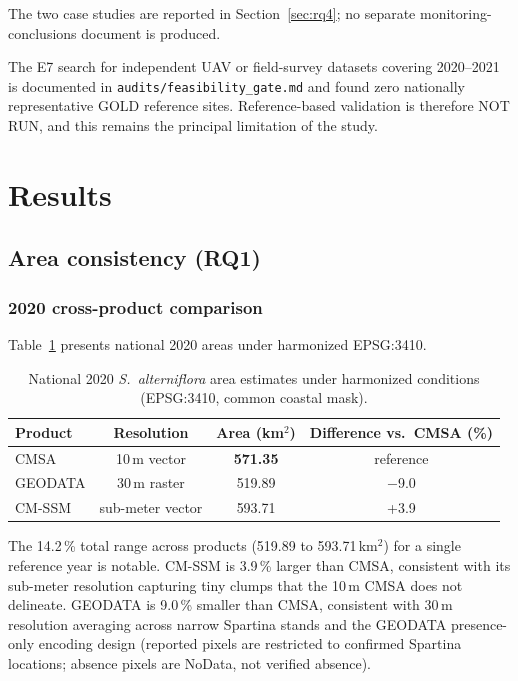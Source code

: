 \documentclass[11pt]{article}
\begin{document}
The two case studies are reported in Section~\ref{sec:rq4}; no separate
monitoring-conclusions document is produced.

The E7 search for independent UAV or field-survey datasets covering 2020--2021
is documented in \texttt{audits/feasibility\_gate.md} and found zero
nationally representative GOLD reference sites. Reference-based validation is
therefore NOT RUN, and this remains the principal limitation of the study.

\section{Results}
\label{sec:results}

\subsection{Area consistency (RQ1)}

\subsubsection{2020 cross-product comparison}

Table~\ref{tab:area2020} presents national 2020 areas under harmonized EPSG:3410.

\begin{table}[htpb]
\centering
\caption{\label{tab:area2020}National 2020 \textit{S.~alterniflora} area estimates
  under harmonized conditions (EPSG:3410, common coastal mask).}
\begin{tabular}{l c c c}
\toprule
Product & Resolution & Area (km$^2$) & Difference vs.\ CMSA (\%) \\
\midrule
CMSA & 10\,m vector & \textbf{571.35} & reference \\
GEODATA & 30\,m raster & 519.89 & $-$9.0 \\
CM-SSM & sub-meter vector & 593.71 & +3.9 \\
\bottomrule
\end{tabular}
\end{table}

The 14.2\,\% total range across products (519.89 to 593.71\,km$^2$) for a single
reference year is notable. CM-SSM is 3.9\,\% larger than CMSA, consistent with its
sub-meter resolution capturing tiny clumps that the 10\,m CMSA does not delineate.
GEODATA is 9.0\,\% smaller than CMSA, consistent with 30\,m resolution averaging
across narrow Spartina stands and the GEODATA presence-only encoding design
(reported pixels are restricted to confirmed Spartina locations; absence pixels
are NoData, not verified absence).
\end{document}
